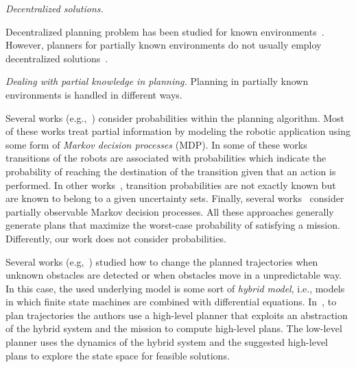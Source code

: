 \emph{Decentralized solutions.}


Decentralized planning problem has been studied for known environments~\cite{schillinger2016decomposition,guo2015multi,tumova2016multi}.
However, planners for partially known environments do not usually employ decentralized solutions~\cite{roy2006planning,du2012robot,diaz2001exploring}. 

\emph{Dealing with partial knowledge in planning.}
Planning in partially known environments is handled in different ways. 
\begin{enumerate*}
\item Several works (e.g.,~\cite{ding2011ltl,kurniawati2011motion,wolff2012robust,du2012robot,Roy2006,chen2012ltl,nikou2017probabilistic,7078886,7139350,narayanan2015task}) consider probabilities within the planning algorithm.
Most of these works  treat partial information by modeling the robotic application using some form of \emph{Markov decision processes} (MDP).
In some of these works~\cite{ding2011ltl,chen2012ltl} transitions of the robots are associated with probabilities which indicate the probability of reaching the destination of the transition given that an action is performed.
In other works~\cite{wolff2012robust}, transition probabilities are not exactly known but are known to belong to a given uncertainty sets.
Finally, several works~\cite{kurniawati2011motion,Roy2006} consider partially observable Markov decision processes.
All these approaches generally generate plans that maximize the worst-case probability of satisfying a mission.
Differently, our work does not consider probabilities.
\item Several works (e.g,~\cite{lahijanian2016iterative,livingston2012backtracking,l2014safety,nie2016searching,7139412}) studied how to change the planned trajectories when unknown obstacles are detected or when obstacles move in a unpredictable way.
In this case, the used underlying model is some sort of \emph{hybrid model}, i.e., models in which finite state machines are combined with differential equations. 
In~\cite{lahijanian2016iterative}, to plan trajectories the authors use a high-level planner that exploits an abstraction of the hybrid system and the mission to compute high-level plans. 
The low-level planner uses the dynamics of the hybrid system and the suggested high-level plans to explore the state space for feasible solutions.

\end{enumerate*}
